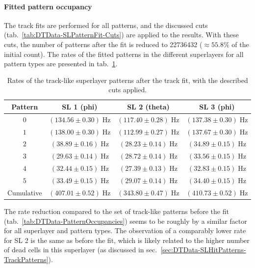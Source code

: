 \paragraph{Fitted pattern occupancy}
The track fits are performed for all patterns, and the discussed cuts (tab.\ \ref{tab:DTData-SLPatternFit-Cuts}) are applied to the results. With these cuts, the number of patterns after the fit is reduced to \num{22736432} ($\approx 55.8 \%$ of the initial count). The rates of the fitted patterns in the different superlayers for all pattern types are presented in tab.\ \ref{tab:DTData-SLPatternFit-PatternOccupancies}.
\begin{table}[htb]
    \centering  %
    \begin{tabular}{|c|c|c|c|} 
        \hline
        Pattern & \ac{SL} 1 (phi) & \ac{SL} 2 (theta) & \ac{SL} 3 (phi) \\ \hline
        $0$ & $(134.56 \pm 0.30)\;\si{\hertz}$ & $(117.40 \pm 0.28)\;\si{\hertz}$ & $(137.38 \pm 0.30)\;\si{\hertz}$ \\
        $1$ & $(138.00 \pm 0.30)\;\si{\hertz}$ & $(112.99 \pm 0.27)\;\si{\hertz}$ & $(137.67 \pm 0.30)\;\si{\hertz}$ \\
        $2$ & $(38.89 \pm 0.16)\;\si{\hertz}$ & $(28.23 \pm 0.14)\;\si{\hertz}$ & $(34.89 \pm 0.15)\;\si{\hertz}$ \\
        $3$ & $(29.63 \pm 0.14)\;\si{\hertz}$ & $(28.72 \pm 0.14)\;\si{\hertz}$ & $(33.56 \pm 0.15)\;\si{\hertz}$ \\
        $4$ & $(32.44 \pm 0.15)\;\si{\hertz}$ & $(27.39 \pm 0.13)\;\si{\hertz}$ & $(32.83 \pm 0.15)\;\si{\hertz}$ \\
        $5$ & $(33.49 \pm 0.15)\;\si{\hertz}$ & $(29.07 \pm 0.14)\;\si{\hertz}$ & $(34.40 \pm 0.15)\;\si{\hertz}$ \\ \hline
        Cumulative & $(407.01 \pm 0.52)\;\si{\hertz}$ & $(343.80 \pm 0.47)\;\si{\hertz}$ & $(410.73 \pm 0.52)\;\si{\hertz}$ \\ \hline
    \end{tabular}
    \caption{Rates of the track-like superlayer patterns after the track fit, with the described cuts applied.}
    \label{tab:DTData-SLPatternFit-PatternOccupancies}
\end{table}
\par The rate reduction compared to the set of track-like patterns before the fit (tab.\ \ref{tab:DTData-PatternOccupancies}) seems to be roughly by a similar factor for all superlayer and pattern types. The observation of a comparably lower rate for \ac{SL} 2 is the same as before the fit, which is likely related to the higher number of dead cells in this superlayer (as discussed in sec.\ \ref{sec:DTData-SLHitPatterns-TrackPatterns}).
